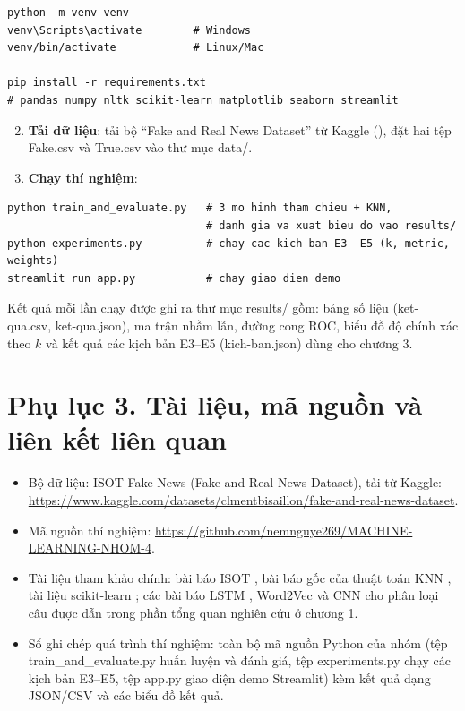 {\small
\begin{verbatim}
python -m venv venv
venv\Scripts\activate        # Windows
venv/bin/activate            # Linux/Mac

pip install -r requirements.txt
# pandas numpy nltk scikit-learn matplotlib seaborn streamlit
\end{verbatim}
}

\begin{enumerate}
    \setcounter{enumi}{1}
    \item \textbf{Tải dữ liệu}: tải bộ ``Fake and Real News Dataset'' từ Kaggle (\cite{dataset}), đặt hai tệp Fake.csv và True.csv vào thư mục data/.
    \item \textbf{Chạy thí nghiệm}:
\end{enumerate}

{\small
\begin{verbatim}
python train_and_evaluate.py   # 3 mo hinh tham chieu + KNN,
                               # danh gia va xuat bieu do vao results/
python experiments.py          # chay cac kich ban E3--E5 (k, metric, weights)
streamlit run app.py           # chay giao dien demo
\end{verbatim}
}

Kết quả mỗi lần chạy được ghi ra thư mục results/ gồm: bảng số liệu (ket-qua.csv, ket-qua.json), ma trận nhầm lẫn, đường cong ROC, biểu đồ độ chính xác theo $k$ và kết quả các kịch bản E3--E5 (kich-ban.json) dùng cho chương 3.

\section*{Phụ lục 3. Tài liệu, mã nguồn và liên kết liên quan}

\begin{itemize}
    \item Bộ dữ liệu: ISOT Fake News (Fake and Real News Dataset), tải từ Kaggle: \url{https://www.kaggle.com/datasets/clmentbisaillon/fake-and-real-news-dataset}.
    \item Mã nguồn thí nghiệm: \url{https://github.com/nemnguye269/MACHINE-LEARNING-NHOM-4}.
    \item Tài liệu tham khảo chính: bài báo ISOT \cite{ahmed2017}, bài báo gốc của thuật toán KNN \cite{coverhart}, tài liệu scikit-learn \cite{sklearn}; các bài báo LSTM \cite{lstm}, Word2Vec \cite{word2vec} và CNN cho phân loại câu \cite{kim2014} được dẫn trong phần tổng quan nghiên cứu ở chương 1.
    \item Sổ ghi chép quá trình thí nghiệm: toàn bộ mã nguồn Python của nhóm (tệp train\_and\_evaluate.py huấn luyện và đánh giá, tệp experiments.py chạy các kịch bản E3--E5, tệp app.py giao diện demo Streamlit) kèm kết quả dạng JSON/CSV và các biểu đồ kết quả.
\end{itemize}

